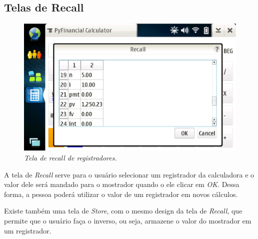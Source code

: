\subsection{Telas de Recall}

\begin{figure}[!h]
 \includegraphics[scale=0.55]{tela_recall.eps}
 \caption{\it Tela de \textit{recall} de registradores.} \label{tab:tela_recall}
\end{figure}

A tela de \textit{Recall} serve para o usuário selecionar um registrador da calculadora e o valor
dele será mandado para o mostrador quando o ele clicar em \textit{OK}. Dessa forma, a pessoa poderá
utilizar o valor de um registrador em novos cálculos.

Existe também uma tela de \textit{Store}, com o mesmo design da tela de \textit{Recall}, que permite que o
usuário faça o inverso, ou seja, armazene o valor do mostrador em um registrador.